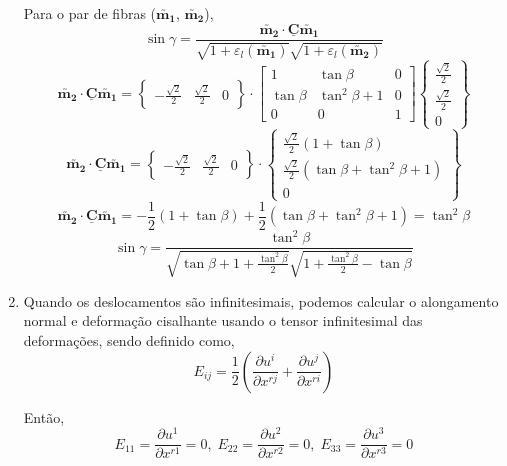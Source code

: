 \begin{enumerate}
    
    Para o par de fibras ($\utilde{\mathbf{m_1}}$, $\utilde{\mathbf{m_2}}$),
    \[
        \sin\gamma=\frac{\utilde{\mathbf{m_2}}\cdot\underline{\mathbf{C}}\utilde{\mathbf{m_1}}}{\sqrt{1+\varepsilon_l(\utilde{\mathbf{m_1}})}\sqrt{1+\varepsilon_l(\utilde{\mathbf{m_2}})}}
    \]
    \[
        \utilde{\mathbf{m_2}}\cdot\underline{\mathbf{C}}\utilde{\mathbf{m_1}}
        =
        \begin{Bmatrix}
            -\frac{\sqrt{2}}{2} & \frac{\sqrt{2}}{2} & 0
        \end{Bmatrix}
        \cdot
        \begin{bmatrix}
            1 & \tan\beta & 0 \\
            \tan\beta & \tan^2\beta + 1 & 0 \\
            0 & 0 & 1
        \end{bmatrix}
        \begin{Bmatrix}
            \frac{\sqrt{2}}{2} \\ \frac{\sqrt{2}}{2} \\ 0
        \end{Bmatrix}
    \]
    \[
        \utilde{\mathbf{m_2}}\cdot\underline{\mathbf{C}}\utilde{\mathbf{m_1}}
        =
        \begin{Bmatrix}
            -\frac{\sqrt{2}}{2} & \frac{\sqrt{2}}{2} & 0
        \end{Bmatrix}
        \cdot
        \begin{Bmatrix}
            \frac{\sqrt{2}}{2}(1+\tan\beta) \\ \frac{\sqrt{2}}{2}(\tan\beta+\tan^2\beta+1) \\ 0
        \end{Bmatrix}
    \]
    \[
        \utilde{\mathbf{m_2}}\cdot\underline{\mathbf{C}}\utilde{\mathbf{m_1}}
        =
        -\frac{1}{2}(1+\tan\beta)+\frac{1}{2}(\tan\beta+\tan^2\beta+1)
        =\tan^2\beta
    \]
    \[
        \sin\gamma=\frac{\tan^2\beta}{\sqrt{\tan\beta+1+\displaystyle\frac{\tan^2\beta}{2}}\sqrt{1+\displaystyle\frac{\tan^2\beta}{2}-\tan\beta}}
    \]
    
    \item Quando os deslocamentos são infinitesimais, podemos calcular o alongamento normal e deformação cisalhante usando o tensor infinitesimal das deformações, sendo definido como,
    \[
        E_{ij}
        =\frac{1}{2}\left(\frac{\partial u^i}{\partial x^{rj}}+\frac{\partial u^j}{\partial x^{ri}}\right)
    \]
    
    Então,
    \[E_{11}=\frac{\partial u^1}{\partial x^{r1}}=0,\;E_{22}=\frac{\partial u^2}{\partial x^{r2}}=0,\;E_{33}=\frac{\partial u^3}{\partial x^{r3}}=0\]
    

\end{enumerate}
